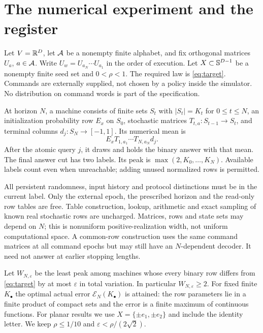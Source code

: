\section{The numerical experiment and the register}\label{sec:model}
Let $V=\mathbb R^D$, let $\mathcal A$ be a nonempty finite alphabet, and fix orthogonal matrices $U_a$, $a\in\mathcal A$. Write $U_w=U_{a_N}\cdots U_{a_1}$ in the order of execution. Let $X\subset\mathbb S^{D-1}$ be a nonempty finite seed set and $0<\rho<1$. The required law is \eqref{eq:target}. Commands are externally supplied, not chosen by a policy inside the simulator. No distribution on command words is part of the specification.

\begin{definition}\label{def:machine}
At horizon $N$, a machine consists of finite sets $S_t$ with $|S_t|=K_t$ for $0\le t\le N$, an initialization probability row $E_x$ on $S_0$, stochastic matrices $T_{t,a}:S_{t-1}\to S_t$, and terminal columns $d_j:S_N\to[-1,1]$. Its numerical mean is
\[
 E_x T_{1,a_1}\cdots T_{N,a_N}d_j.
\]
After the atomic query $j$, it draws and holds the binary answer with that mean. The final answer cut has two labels. Its peak is $\max(2,K_0,\ldots,K_N)$. Available labels count even when unreachable; adding unused normalized rows is permitted.
\end{definition}

All persistent randomness, input history and protocol distinctions must be in the current label. Only the external epoch, the prescribed horizon and the read-only row tables are free. Table construction, lookup, arithmetic and exact sampling of known real stochastic rows are uncharged. Matrices, rows and state sets may depend on $N$; this is nonuniform positive-realization width, not uniform computational space. A common-row construction uses the same command matrices at all command epochs but may still have an $N$-dependent decoder. It need not answer at earlier stopping lengths.

Let $W_{N,\varepsilon}$ be the least peak among machines whose every binary row differs from \eqref{eq:target} by at most $\varepsilon$ in total variation. In particular $W_{N,\varepsilon}\ge2$. For fixed finite $K_\bullet$ the optimal actual error $\mathcal E_N(K_\bullet)$ is attained: the row parameters lie in a finite product of compact sets and the error is a finite maximum of continuous functions. For planar results we use $X=\{\pm e_1,\pm e_2\}$ and include the identity letter. We keep $\rho\le1/10$ and $\varepsilon<\rho/(2\sqrt2)$.

